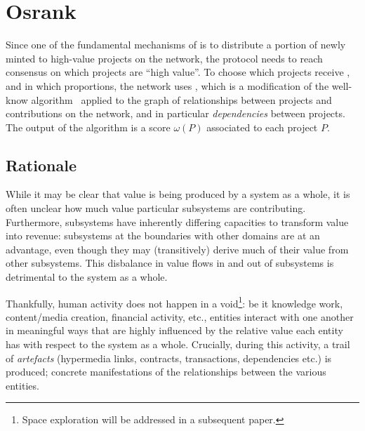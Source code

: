 \section{Osrank}
\label{s:osrank}


\def\Graph{\mathsf{Graph}}
\def\proj{\mathsf{proj}}
\def\user{\mathsf{user}}
\def\dep{\mathsf{dep}}
\def\own{\mathsf{own}}
\def\coown{\mathsf{own}^\circ}
\def\contrib{\mathsf{contrib}}
\def\cocontrib{\mathsf{contrib}^\circ}

Since one of the fundamental mechanisms of \oscoin{} is to distribute a portion
of newly minted \oscoin{} to high-value projects on the network, the protocol
needs to reach consensus on which projects are ``high value''. To choose which
projects receive \oscoin{}, and in which proportions, the network uses
\osrank{}, which is a modification of the well-know \pagerank{}
algorithm~\cite{pagerank} applied to the graph of relationships between
projects and contributions on the network, and in particular
\emph{dependencies} between projects. The output of the algorithm is a score
$\omega(P)$ associated to each project $P$.

\subsection{Rationale}

While it may be clear that value is being produced by a system as a whole, it is
often unclear how much value particular subsystems are
contributing. Furthermore, subsystems have inherently differing capacities to
transform value into revenue: subsystems at the boundaries with other domains
are at an advantage, even though they may (transitively) derive much of their
value from other subsystems. This disbalance in value flows in and out of
subsystems is detrimental to the system as a whole.

Thankfully, human activity does not happen in a void\footnote{Space
  exploration will be addressed in a subsequent paper.}: be it
knowledge work, content/media creation, financial activity, etc.,
entities interact with one another in meaningful ways that are highly
influenced by the relative value each entity has with respect to the
system as a whole. Crucially, during this activity, a trail of
\emph{artefacts} (hypermedia links, contracts, transactions,
dependencies etc.) is produced; concrete manifestations
of the relationships between the various entities.

